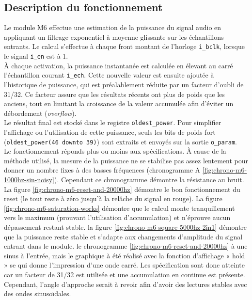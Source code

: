 

\subsection{Description du fonctionnement}

Le module M6 effectue une estimation de la puissance du signal audio en
appliquant un filtrage exponentiel à moyenne glissante sur les échantillons
entrants. Le calcul s'effectue à chaque front montant de l'horloge
\verb|i_bclk|, lorsque le signal \verb|i_en| est à 1. \\

À chaque activation, la puissance instantanée est calculée en élevant au
carré l'échantillon courant \verb|i_ech|. Cette nouvelle valeur est ensuite
ajoutée à l'historique de puissance, qui est préalablement réduite par un
facteur d'oubli de 31/32. Ce facteur assure que les résultats récents ont
plus de poids que les anciens, tout en limitant la croissance de la valeur
accumulée afin d'éviter un débordement (\emph{overflow}). \\

Le résultat final est stocké dans le registre \verb|oldest_power|. Pour
simplifier l'affichage ou l'utilisation de cette puissance, seuls les bits de
poids fort (\verb|oldest_power(46 downto 39)|) sont extraits et envoyés sur
la sortie \verb|o_param|. \\

Le fonctionnement réponds plus ou moins aux spécifications. 
À cause de la méthode utilisé, la mesure de la puissance ne se stabilise pas assez lentement pour donner un nombre fixes 
à des basses fréquences (chronogramme A \ref{fig:chrono-m6-1000hz-sin-noisy}). Cependant ce chronogramme démontre la résistance au bruit. 
La figure \ref{fig:chrono-m6-reset-and-20000hz} démontre le bon fonctionnement du reset (le tout reste à zéro jusqu’à la relâche du signal en rouge). 
La figure \ref{fig:chrono-m6-saturation-works} démontre que le calcul monte tranquillement vers le maximum (prouvant l'utilisation d'accumulation)
et n'éprouve aucun dépassement restant stable. la figure \ref{fig:chrono-m6-square-5000hz-2in1} démontre que la puissance reste stable et s'adapte 
aux changements d'amplitude du signal entrant dans le module. le chronogramme \ref{fig:chrono-m6-reset-and-20000hz} à une sinus à l'entrée, mais le graphique
à été réalisé avec la fonction d'affichage « hold » se qui donne l'impression d'une onde carré. Les spécification sont 
donc atteinte car un facteur de 31/32 est utilisée et une accumulation en continue est présente. Cependant, l'angle d'approche
serait à revoir afin d'avoir des lectures stables avec des ondes sinusoïdales.


